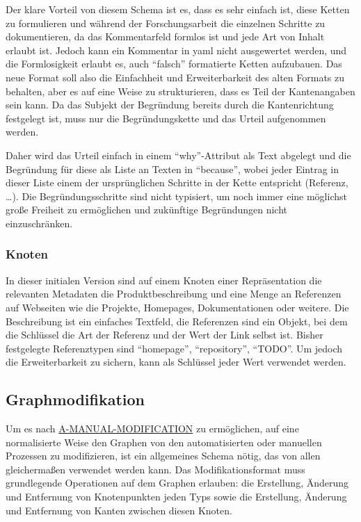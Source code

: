 Der klare Vorteil von diesem Schema ist es, dass es sehr einfach ist, diese Ketten zu formulieren und während der Forschungsarbeit die einzelnen Schritte zu dokumentieren, da das Kommentarfeld formlos ist und jede Art von Inhalt erlaubt ist.
Jedoch kann ein Kommentar in \acrshort{yaml} nicht ausgewertet werden, und die Formlosigkeit erlaubt es, auch \enquote{falsch} formatierte Ketten aufzubauen.
Das neue Format soll also die Einfachheit und Erweiterbarkeit des alten Formats zu behalten, aber es auf eine Weise zu strukturieren, dass es Teil der Kantenangaben sein kann.
Da das Subjekt der Begründung bereits durch die Kantenrichtung festgelegt ist, muss nur die Begründungskette und das Urteil aufgenommen werden.

Daher wird das Urteil einfach in einem \enquote{why}-Attribut als Text abgelegt und die Begründung für diese als Liste an Texten in \enquote{because}, wobei jeder Eintrag in dieser Liste einem der ursprünglichen Schritte in der Kette entspricht (Referenz, \ldots).
Die Begründungsschritte sind nicht typisiert, um noch immer eine möglichst große Freiheit zu ermöglichen und zukünftige Begründungen nicht einzuschränken.

\subsubsection{Knoten}

In dieser initialen Version sind auf einem Knoten einer Repräsentation die relevanten Metadaten die Produktbeschreibung und eine Menge an Referenzen auf Webseiten wie die Projekte, Homepages, Dokumentationen oder weitere.
Die Beschreibung ist ein einfaches Textfeld, die Referenzen sind ein Objekt, bei dem die Schlüssel die Art der Referenz und der Wert der Link selbst ist.
Bisher festgelegte Referenztypen sind \enquote{homepage}, \enquote{repository}, \enquote{TODO}. %
Um jedoch die Erweiterbarkeit zu sichern, kann als Schlüssel jeder Wert verwendet werden.

\subsection{Graphmodifikation}\label{subsec:model-graph-modification}

Um es nach \hyperref[subsec:req-manual-format-modification]{A-MANUAL-MODIFICATION} zu ermöglichen, auf eine normalisierte Weise den Graphen von den automatisierten oder manuellen Prozessen zu modifizieren, ist ein allgemeines Schema nötig, das von allen gleichermaßen verwendet werden kann.
Das Modifikationsformat muss grundlegende Operationen auf dem Graphen erlauben: die Erstellung, Änderung und Entfernung von Knotenpunkten jeden Typs sowie die Erstellung, Änderung und Entfernung von Kanten zwischen diesen Knoten.

